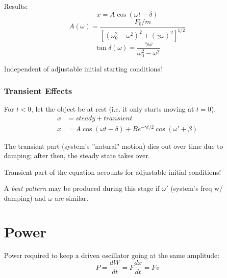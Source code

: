 Results: 
\[ x = A \cos (\omega t - \delta) \]
\[ A(\omega) = \frac{F_0/m}{[(\omega_0^2 - \omega^2)^2 + (\gamma\omega)^2]^{1/2}} \]
\[ \tan \delta (\omega) = \frac{\gamma\omega}{\omega_0^2 - \omega^2}\]

Independent of adjustable initial starting conditions!

\subsubsection{Transient Effects}
For $t<0$, let the object be at rest (i.e. it only starts moving at $t=0$).
\begin{align*}
x &= steady + transient \\
x &= A \cos (\omega t - \delta) + B e^{-\gamma t/2} \cos(\omega' + \beta)
\end{align*}

The transient part (system's ''natural" motion) dies out over time due to damping; after then, the steady state takes over. 

Transient part of the equation accounts for adjustable initial conditions!

A \emph{beat pattern} may be produced during this stage if $\omega'$ (system's freq w/ damping) and $\omega$ are similar.

\section{Power}
Power required to keep a driven oscillator going at the same amplitude:
\[ P = \frac{dW}{dt} = F\frac{dx}{dt} = Fv \]